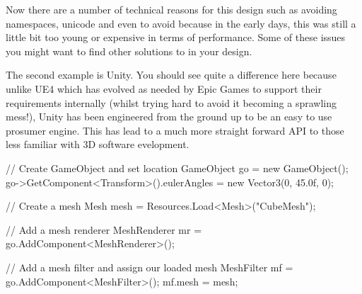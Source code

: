 \documentclass[10pt]{article}
\begin{document}
Now there are a number of technical reasons for this design such as
avoiding namespaces, unicode and even to avoid  because
in the early days, this was still a little bit too young or expensive in
terms of performance. Some of these issues you might want to find other
solutions to in your design.


The second example is Unity. You should see quite a difference here
because unlike UE4 which has evolved as needed by Epic Games to support
their requirements internally (whilst trying hard to avoid it becoming
a sprawling mess!), Unity has been engineered from the ground up to be
an easy to use prosumer engine. This has lead to a much more straight
forward API to those less familiar with 3D software evelopment.

\begin{Code}

// Create GameObject and set location
GameObject go = new GameObject();
go->GetComponent<Transform>().eulerAngles = new Vector3(0, 45.0f, 0);

// Create a mesh
Mesh mesh = Resources.Load<Mesh>("CubeMesh");

// Add a mesh renderer
MeshRenderer mr = go.AddComponent<MeshRenderer>();

// Add a mesh filter and assign our loaded mesh
MeshFilter mf = go.AddComponent<MeshFilter>();
mf.mesh = mesh;

\end{Code}
\end{document}
